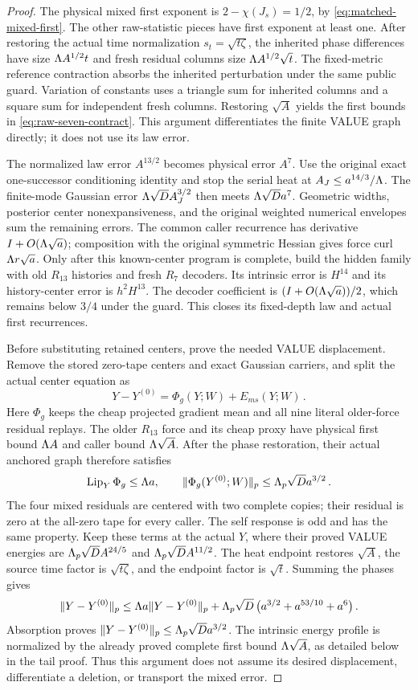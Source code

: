 \documentclass[11pt]{article}
\numberwithin{equation}{section}
\theoremstyle{remark}\newtheorem{remark}[theorem]{Remark}
\newcommand{\norm}[1]{\lVert#1\rVert}
\begin{document}
\begin{proof}
The physical mixed first exponent is
$2-\chi(J_s)=1/2$, by \eqref{eq:matched-mixed-first}.
The other raw-statistic pieces have first exponent at least one.
After restoring the actual time normalization $s_t=\sqrt{t\zeta}$,
the inherited phase differences have size $\Lambda A^{1/2}t$ and
fresh residual columns size $\Lambda A^{1/2}\sqrt t$.
The fixed-metric reference contraction absorbs the inherited
perturbation under the same public guard. Variation of constants
uses a triangle sum for inherited columns and a square sum for
independent fresh columns. Restoring $\sqrt A$ yields the first
bounds in \eqref{eq:raw-seven-contract}. This argument differentiates
the finite VALUE graph directly; it does not use its law error.

The normalized law error $A^{13/2}$ becomes physical error $A^7$.
Use the original exact one-successor conditioning identity and stop
the serial heat at $A_J\le a^{14/3}/\Lambda$. The finite-mode Gaussian
error $\Lambda\sqrt D A_J^{3/2}$ then meets $\Lambda\sqrt D a^7$.
Geometric widths, posterior center nonexpansiveness, and the original
weighted numerical envelopes sum the remaining errors. The common
caller recurrence has derivative $I+O(\Lambda\sqrt a)$; composition
with the original symmetric Hessian gives force curl $\Lambda r\sqrt a$.
Only after this known-center program is complete, build the hidden
family with old $R_{13}$ histories and fresh $R_7$ decoders.
Its intrinsic error is $H^{14}$ and its history-center error is
$h^2H^{13}$. The decoder coefficient is
$(I+O(\Lambda\sqrt a))/2$, which remains below $3/4$ under the guard.
This closes its fixed-depth law and actual first recurrences.

Before substituting retained centers, prove the needed VALUE
displacement. Remove the stored zero-tape centers and exact Gaussian
carriers, and split the actual center equation as
\[
 Y-Y^{(0)}=\Phi_g(Y;W)+E_{ms}(Y;W)\,.
\]
Here $\Phi_g$ keeps the cheap projected gradient mean and all nine
literal older-force residual replays. The older $R_{13}$ force and
its cheap proxy have physical first bound $\Lambda A$ and caller bound
$\Lambda\sqrt A$. After the phase restoration, their actual anchored
graph therefore satisfies
\[
 \Lip_Y\Phi_g\le\LL a,\qquad
 \norm{\Phi_g(Y^{(0)};W)}_p\le\LL_p\sqrt D a^{3/2}\,.
\]
The four mixed residuals are centered with two complete copies;
their residual is zero at the all-zero tape for every caller.
The self response is odd and has the same property. Keep these
terms at the actual $Y$, where their proved VALUE energies are
$\Lambda_p\sqrt D A^{24/5}$ and $\Lambda_p\sqrt D A^{11/2}$.
The heat endpoint restores $\sqrt A$, the source time factor is
$\sqrt{t\zeta}$, and the endpoint factor is $\sqrt t$.
Summing the phases gives
\[
 \norm{Y-Y^{(0)}}_p
 \le\LL a\norm{Y-Y^{(0)}}_p
       +\LL_p\sqrt D\,\bigl(a^{3/2}+a^{53/10}+a^6\bigr)\,.
\]
Absorption proves $\norm{Y-Y^{(0)}}_p\le\LL_p\sqrt D a^{3/2}$.
The intrinsic energy profile is normalized by the already proved
complete first bound $\Lambda\sqrt A$, as detailed below in the tail
proof. Thus this argument does not assume its desired displacement,
differentiate a deletion, or transport the mixed error.


\end{proof}
\end{document}
